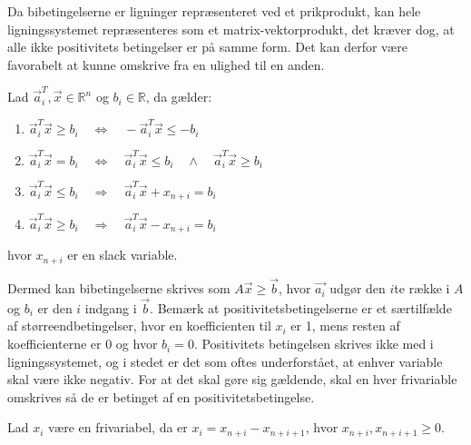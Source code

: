 Da bibetingelserne er ligninger repræsenteret ved et prikprodukt, kan hele ligningssystemet repræsenteres som et matrix-vektorprodukt, det kræver dog, at alle ikke positivitets betingelser er på samme form.
Det kan derfor være favorabelt at kunne omskrive fra en ulighed til en anden.
\begin{stn}
Lad $\vec{a}_i^T,\vec{x} \in \mathds{R}^n$ og $b_i \in \mathds{R}$, da gælder:
\begin{enumerate}
\item $\vec{a}_i^T\vec{x} \geq b_i \quad \Leftrightarrow \quad -\vec{a}_i^T\vec{x} \leq -b_i$
\item $\vec{a}_i^T\vec{x} = b_i \quad \Leftrightarrow  \quad  \vec{a}_i^T\vec{x} \leq b_i \quad \wedge \quad  \vec{a}_i^T\vec{x} \geq b_i$
\item $\vec{a}_i^T \vec{x}  \leq b_i \quad \Rightarrow \quad  \vec{a}_i^T \vec{x}  +  x_{n+i}  = b_i$
\item $\vec{a}_i^T \vec{x}  \geq b_i \quad \Rightarrow \quad  \vec{a}_i^T \vec{x}  - x_{n+i}  = b_i$
\end{enumerate}
hvor $x_{n+i}$ er en slack variable. 
\end{stn}
Dermed kan bibetingelserne skrives som $A\vec{x}\geq \vec{b}$, hvor $\vec{a_i}$ udgør den $i$te række i $A$ og $b_i$ er den $i$ indgang i $\vec{b}$.
Bemærk at positivitetsbetingelserne er et særtilfælde af størreendbetingelser, hvor en koefficienten til $x_i$ er 1, mens resten af koefficienterne er 0 og hvor $b_i=0$.
Positivitets betingelsen skrives ikke med i ligningssystemet, og i stedet er det som oftes underforstået, at enhver variable skal være ikke negativ.
For at det skal gøre sig gældende, skal en hver frivariable omskrives så de er betinget af en positivitetsbetingelse.
\begin{stn}
Lad $x_i$ være en frivariabel, da er $x_i = x_{n+i}-x_{n+i+1}$, hvor $x_{n+i},x_{n+i+1}\geq 0$.
\end{stn}